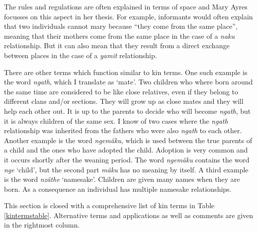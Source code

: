 The rules and regulations are often explained in terms of space and Mary Ayres focusses on this aspect in her thesis. For example, informants would often explain that two individuals cannot mary because ``they come from the same place'', meaning that their mothers come from the same place in the case of a \emph{naku} relationship. But it can also mean that they result from a direct exchange between places in the case of a \emph{yamit} relationship.%

There are other terms which function similar to kin terms. One such example is the word \emph{ngath}, which I translate as `mate'. Two children who where born around the same time are considered to be like close relatives, even if they belong to different clans and/or sections. They will grow up as close mates and they will help each other out. It is up to the parents to decide who will become \emph{ngath}, but it is always children of the same sex. I know of two cases where the \emph{ngath} relationship was inherited from the fathers who were also \emph{ngath} to each other. Another example is the word \emph{ngemäku}, which is used between the true parents of a child and the ones who have adopted the child. Adoption is very common and it occurs shortly after the weaning period. The word \emph{ngemäku} contains the word \emph{nge} `child', but the second part \emph{mäku} has no meaning by itself. A third example is the word \emph{nzäthe} `namesake'. Children are given many names when they are born. As a consequence an individual has multiple namesake relationships.%

This section is closed with a comprehensive list of kin terms in Table \ref{kintermstable}. Alternative terms and applications as well as comments are given in the rightmost column.

